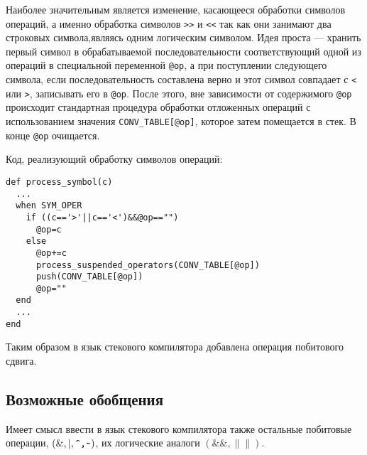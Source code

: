 Наиболее значительным является изменение, касающееся обработки символов операций,
а именно обработка символов \verb|>>| и \verb|<<| так как они занимают два
строковых символа,являясь одним логическим символом. Идея проста --- хранить
первый символ в обрабатываемой последовательности соответствующий одной из
операций в специальной переменной \verb|@op|, а при поступлении следующего
символа, если последовательность составлена верно и этот символ совпадает с
\verb|<| или \verb|>|, записывать его в \verb|@op|. После этого, вне зависимости
от содержимого \verb|@op| происходит стандартная процедура обработки отложенных
операций с использованием значения \verb|CONV_TABLE[@op]|, которое затем
помещается в стек. В конце \verb|@op| очищается.

\newpage

Код, реализующий обработку символов операций:
\begin{lstlisting}
def process_symbol(c)
  ...
  when SYM_OPER
    if ((c=='>'||c=='<')&&@op=="")
      @op=c
    else
      @op+=c
      process_suspended_operators(CONV_TABLE[@op])
      push(CONV_TABLE[@op])
      @op=""
  end
  ...
end
\end{lstlisting}

Таким образом в язык стекового компилятора добавлена операция побитового сдвига.
\subsection{Возможные обобщения}
Имеет смысл ввести в язык стекового компилятора также остальные побитовые операции,
$\left(\&,|,\verb|^,~|\right)$, их логические аналоги $\left(\&\&,\|\|\right)$.
